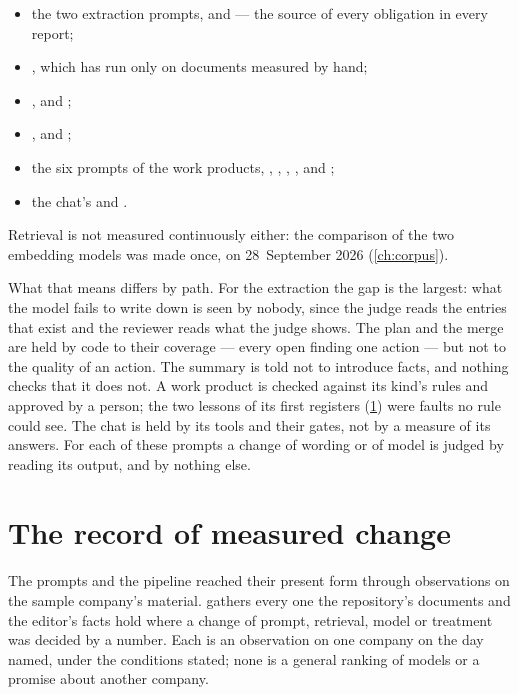 \begin{itemize}
  \item the two extraction prompts,  and
     --- the source of every obligation in every report;
  \item {}, which has run only on documents measured by hand;
  \item {},  and
    ;
  \item {},  and ;
  \item the six prompts of the work products, ,
    , , ,
     and ;
  \item the chat's  and .
\end{itemize}

Retrieval is not measured continuously either: the comparison of the two embedding models was
made once, on 28~September 2026 (\cref{ch:corpus}).

What that means differs by path. For the extraction the gap is the largest: what the model
fails to write down is seen by nobody, since the judge reads the entries that exist and the
reviewer reads what the judge shows. The plan and the merge are held by code to their
coverage --- every open finding one action --- but not to the quality of an action. The
summary is told not to introduce facts, and nothing checks that it does not. A work product
is checked against its kind's rules and approved by a person; the two lessons of its first
registers (\cref{sec:control:record}) were faults no rule could see. The chat is held by its
tools and their gates, not by a measure of its answers. For each of these prompts a change of
wording or of model is judged by reading its output, and by nothing else.


\section{The record of measured change}\label{sec:control:record}

The prompts and the pipeline reached their present form through observations on the sample
company's material.  gathers every one the repository's documents
and the editor's facts hold where a change of prompt, retrieval, model or treatment was
decided by a number. Each is an observation on one company on the day named, under the
conditions stated; none is a general ranking of models or a promise about another company.

